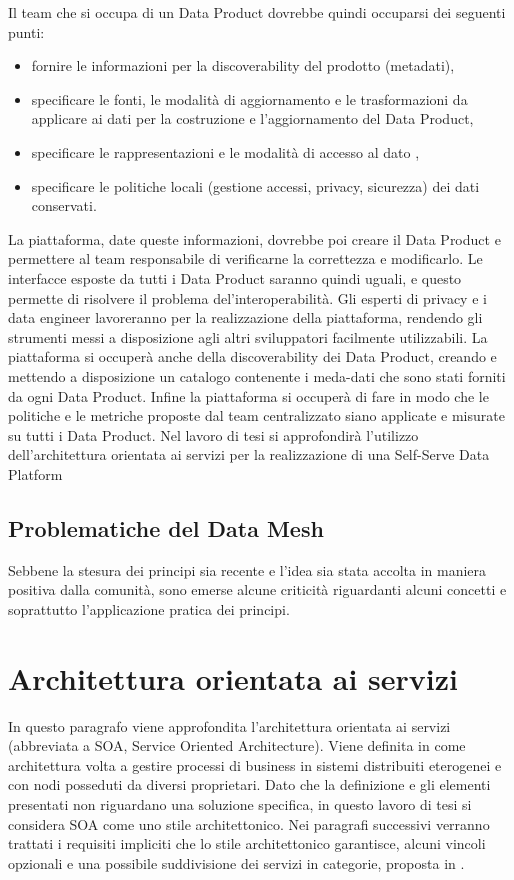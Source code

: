 \documentclass[12pt]{report}
\begin{document}
Il team che si occupa di un Data Product dovrebbe quindi occuparsi dei seguenti punti:
\begin{itemize}
    \item fornire le informazioni per la discoverability del prodotto (metadati),
    \item specificare le fonti, le modalità di aggiornamento e le trasformazioni da applicare ai dati per la costruzione e l'aggiornamento del Data Product,
    \item specificare le rappresentazioni e le modalità di accesso al dato ,
    \item specificare le politiche locali (gestione accessi, privacy, sicurezza) dei dati conservati.
\end{itemize}
La piattaforma, date queste informazioni, dovrebbe poi creare il Data Product e permettere al team responsabile di verificarne la correttezza e modificarlo. 
Le interfacce esposte da tutti i Data Product saranno quindi uguali, e questo permette di risolvere il problema del'interoperabilità.
Gli esperti di privacy e i data engineer lavoreranno per la realizzazione della piattaforma, rendendo gli strumenti messi a disposizione agli altri sviluppatori facilmente utilizzabili.
La piattaforma si occuperà anche della discoverability dei Data Product, creando e mettendo a disposizione un catalogo contenente i meda-dati che sono stati forniti da ogni Data Product.
Infine la piattaforma si occuperà di fare in modo che le politiche e le metriche proposte dal team centralizzato siano applicate e misurate su tutti i Data Product.
Nel lavoro di tesi si approfondirà l'utilizzo dell'architettura orientata ai servizi per la realizzazione di una Self-Serve Data Platform

\subsection{Problematiche del Data Mesh}
Sebbene la stesura dei principi sia recente e l'idea sia stata accolta in maniera positiva dalla comunità, sono emerse alcune criticità riguardanti alcuni concetti e soprattutto l'applicazione pratica dei principi.



\section{Architettura orientata ai servizi} \label{servizio}
In questo paragrafo viene approfondita l'architettura orientata ai servizi (abbreviata a SOA, Service Oriented Architecture).
Viene definita in \cite{josuttis_soa_2007} come architettura volta a gestire processi di business in sistemi distribuiti eterogenei e con nodi posseduti da diversi proprietari.
Dato che la definizione e gli elementi presentati non riguardano una soluzione specifica, in questo lavoro di tesi si considera SOA come uno stile architettonico.
Nei paragrafi successivi verranno trattati i requisiti impliciti che lo stile architettonico garantisce, alcuni vincoli opzionali e una possibile suddivisione dei servizi in categorie, proposta in \cite {josuttis_soa_2007}.
\end{document}
